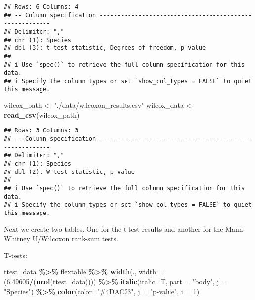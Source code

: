 \documentclass[
]{article}
\newenvironment{Shaded}{\begin{snugshade}}{\end{snugshade}}
\newcommand{\AttributeTok}[1]{\textcolor[rgb]{0.13,0.29,0.53}{#1}}
\newcommand{\DecValTok}[1]{\textcolor[rgb]{0.00,0.00,0.81}{#1}}
\newcommand{\FloatTok}[1]{\textcolor[rgb]{0.00,0.00,0.81}{#1}}
\newcommand{\FunctionTok}[1]{\textcolor[rgb]{0.13,0.29,0.53}{\textbf{#1}}}
\newcommand{\NormalTok}[1]{#1}
\newcommand{\OtherTok}[1]{\textcolor[rgb]{0.56,0.35,0.01}{#1}}
\newcommand{\SpecialCharTok}[1]{\textcolor[rgb]{0.81,0.36,0.00}{\textbf{#1}}}
\newcommand{\StringTok}[1]{\textcolor[rgb]{0.31,0.60,0.02}{#1}}
\begin{document}
\begin{verbatim}
## Rows: 6 Columns: 4
## -- Column specification --------------------------------------------------------
## Delimiter: ","
## chr (1): Species
## dbl (3): t test statistic, Degrees of freedom, p-value
## 
## i Use `spec()` to retrieve the full column specification for this data.
## i Specify the column types or set `show_col_types = FALSE` to quiet this message.
\end{verbatim}

\begin{Shaded}
\begin{Highlighting}[]
\NormalTok{wilcox\_path }\OtherTok{\textless{}{-}} \StringTok{"./data/wilcoxon\_results.csv"}
\NormalTok{wilcox\_data }\OtherTok{\textless{}{-}} \FunctionTok{read\_csv}\NormalTok{(wilcox\_path)}
\end{Highlighting}
\end{Shaded}

\begin{verbatim}
## Rows: 3 Columns: 3
## -- Column specification --------------------------------------------------------
## Delimiter: ","
## chr (1): Species
## dbl (2): W test statistic, p-value
## 
## i Use `spec()` to retrieve the full column specification for this data.
## i Specify the column types or set `show_col_types = FALSE` to quiet this message.
\end{verbatim}

Next we create two tables. One for the t-test results and another for
the Mann-Whitney U/Wilcoxon rank-sum tests.

T-tests:

\begin{Shaded}
\begin{Highlighting}[]
\NormalTok{ttest\_data }\SpecialCharTok{\%\textgreater{}\%}
\NormalTok{  flextable }\SpecialCharTok{\%\textgreater{}\%}
  \FunctionTok{width}\NormalTok{(., }\AttributeTok{width =}\NormalTok{ (}\FloatTok{6.49605}\SpecialCharTok{/}\NormalTok{(}\FunctionTok{ncol}\NormalTok{(ttest\_data)))) }\SpecialCharTok{\%\textgreater{}\%}
  \FunctionTok{italic}\NormalTok{(}\AttributeTok{italic=}\NormalTok{T, }\AttributeTok{part =} \StringTok{"body"}\NormalTok{, }\AttributeTok{j =} \StringTok{"Species"}\NormalTok{) }\SpecialCharTok{\%\textgreater{}\%}
  \FunctionTok{color}\NormalTok{(}\AttributeTok{color=}\StringTok{"\#4DAC23"}\NormalTok{, }\AttributeTok{j =} \StringTok{"p{-}value"}\NormalTok{, }\AttributeTok{i =} \DecValTok{1}\NormalTok{)}
\end{Highlighting}
\end{Shaded}
\end{document}

